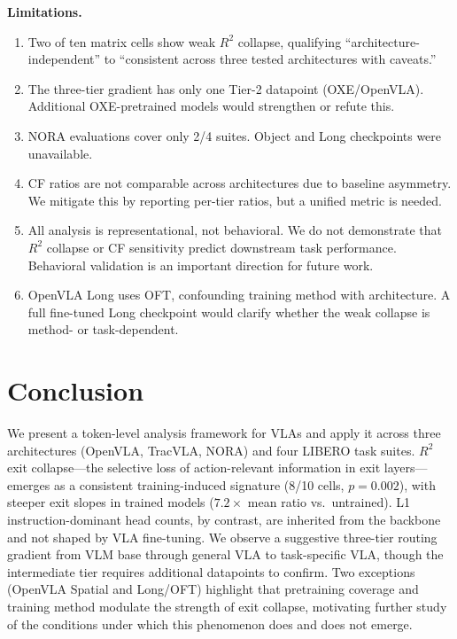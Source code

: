 \documentclass[10pt,twocolumn]{article}
\begin{document}
\textbf{Limitations.}
\begin{enumerate}[nosep,leftmargin=*]
  \item Two of ten matrix cells show weak $R^2$ collapse, qualifying ``architecture-independent'' to ``consistent across three tested architectures with caveats.''
  \item The three-tier gradient has only one Tier-2 datapoint (OXE/OpenVLA). Additional OXE-pretrained models would strengthen or refute this.
  \item NORA evaluations cover only 2/4 suites. Object and Long checkpoints were unavailable.
  \item CF ratios are not comparable across architectures due to baseline asymmetry. We mitigate this by reporting per-tier ratios, but a unified metric is needed.
  \item All analysis is representational, not behavioral. We do not demonstrate that $R^2$ collapse or CF sensitivity predict downstream task performance. Behavioral validation is an important direction for future work.
  \item OpenVLA Long uses OFT, confounding training method with architecture. A full fine-tuned Long checkpoint would clarify whether the weak collapse is method- or task-dependent.
\end{enumerate}

\section{Conclusion}

We present a token-level analysis framework for VLAs and apply it across three architectures (OpenVLA, TracVLA, NORA) and four LIBERO task suites.
$R^2$ exit collapse---the selective loss of action-relevant information in exit layers---emerges as a consistent training-induced signature (8/10 cells, $p = 0.002$), with steeper exit slopes in trained models ($7.2\times$ mean ratio vs.\ untrained).
L1 instruction-dominant head counts, by contrast, are inherited from the backbone and not shaped by VLA fine-tuning.
We observe a suggestive three-tier routing gradient from VLM base through general VLA to task-specific VLA, though the intermediate tier requires additional datapoints to confirm.
Two exceptions (OpenVLA Spatial and Long/OFT) highlight that pretraining coverage and training method modulate the strength of exit collapse, motivating further study of the conditions under which this phenomenon does and does not emerge.
\end{document}
